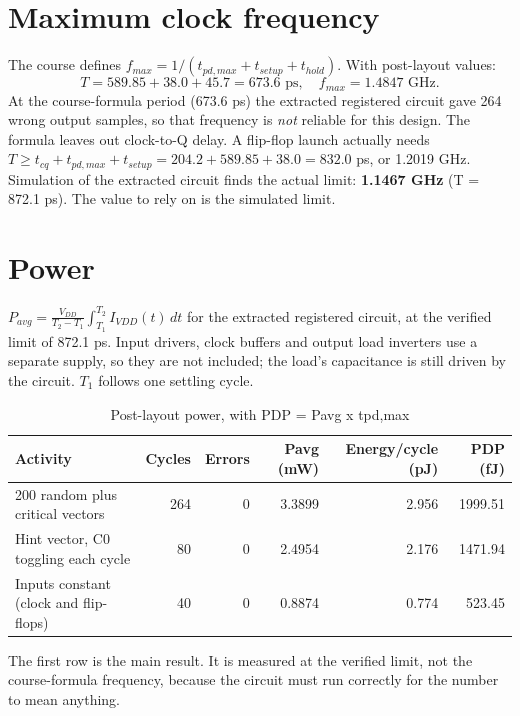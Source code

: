 \documentclass[10pt,a4paper]{article}
\begin{document}
\section{Maximum clock frequency}
The course defines $f_{max}=1/(t_{pd,max}+t_{setup}+t_{hold})$. With post-layout values:
\[T=589.85+38.0+45.7=673.6\text{ ps},\quad f_{max}=1.4847\text{ GHz}.\]
At the course-formula period (673.6 ps) the extracted registered circuit gave 264 wrong output samples, so that frequency is \emph{not} reliable for this design. The formula leaves out clock-to-Q delay. A flip-flop launch actually needs $T\ge t_{cq}+t_{pd,max}+t_{setup}=204.2+589.85+38.0=832.0$ ps, or 1.2019 GHz. Simulation of the extracted circuit finds the actual limit: \textbf{1.1467 GHz} (T = 872.1 ps). The value to rely on is the simulated limit.

\section{Power}
$P_{avg}=\frac{V_{DD}}{T_2-T_1}\int_{T_1}^{T_2}I_{VDD}(t)\,dt$ for the extracted registered circuit, at the verified limit of 872.1 ps. Input drivers, clock buffers and output load inverters use a separate supply, so they are not included; the load's capacitance is still driven by the circuit. $T_1$ follows one settling cycle.

\begin{table}[H]\centering
\footnotesize
\caption{Post-layout power, with PDP = Pavg x tpd,max}
\begin{tabular}{lrrrrr}
\toprule
\textbf{Activity} & \textbf{Cycles} & \textbf{Errors} & \textbf{Pavg (mW)} & \textbf{Energy/cycle (pJ)} & \textbf{PDP (fJ)} \\
\midrule
200 random plus critical vectors & 264 & 0 & 3.3899 & 2.956 & 1999.51 \\
Hint vector, C0 toggling each cycle & 80 & 0 & 2.4954 & 2.176 & 1471.94 \\
Inputs constant (clock and flip-flops) & 40 & 0 & 0.8874 & 0.774 & 523.45 \\
\bottomrule
\end{tabular}
\end{table}

The first row is the main result. It is measured at the verified limit, not the course-formula frequency, because the circuit must run correctly for the number to mean anything.
\end{document}
